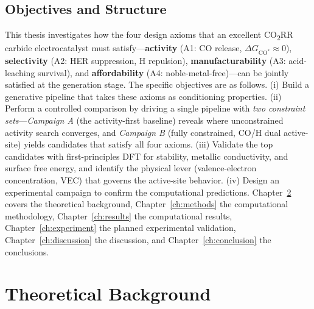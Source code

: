 \documentclass[11pt,a4paper]{report}
\newcommand{\dGCO}{\Delta G_{\mathrm{CO^*}}}
\begin{document}
\section{Objectives and Structure}
This thesis investigates how the four design axioms that an excellent CO\textsubscript{2}RR carbide electrocatalyst must satisfy---\textbf{activity} (A1: CO release, $\dGCO\!\approx\!0$), \textbf{selectivity} (A2: HER suppression, H repulsion), \textbf{manufacturability} (A3: acid-leaching survival), and \textbf{affordability} (A4: noble-metal-free)---can be jointly satisfied at the generation stage. The specific objectives are as follows. (i) Build a generative pipeline that takes these axioms as conditioning properties. (ii) Perform a controlled comparison by driving a single pipeline with \emph{two constraint sets}---\emph{Campaign A} (the activity-first baseline) reveals where unconstrained activity search converges, and \emph{Campaign B} (fully constrained, CO/H dual active-site) yields candidates that satisfy all four axioms. (iii) Validate the top candidates with first-principles DFT for stability, metallic conductivity, and surface free energy, and identify the physical lever (valence-electron concentration, VEC) that governs the active-site behavior. (iv) Design an experimental campaign to confirm the computational predictions. Chapter~\ref{ch:theory} covers the theoretical background, Chapter~\ref{ch:methods} the computational methodology, Chapter~\ref{ch:results} the computational results, Chapter~\ref{ch:experiment} the planned experimental validation, Chapter~\ref{ch:discussion} the discussion, and Chapter~\ref{ch:conclusion} the conclusions.

\chapter{Theoretical Background}
\label{ch:theory}
\end{document}
